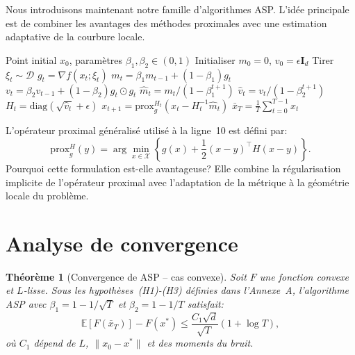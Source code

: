 \documentclass[12pt,a4paper]{report}
\newtheorem{theoreme}{Th\'eor\`eme}[chapter]
\begin{document}
Nous introduisons maintenant notre famille d'algorithmes ASP. L'id\'ee
principale est de combiner les avantages des m\'ethodes proximales avec
une estimation adaptative de la courbure locale.

\begin{algorithm}
\caption{ASP -- Adaptive Stochastic Proximal}\label{alg:asp}
\begin{algorithmic}[1]
\Require Point initial $x_0$, param\`etres $\beta_1, \beta_2 \in (0,1)$
\State Initialiser $m_0 = 0$, $v_0 = \epsilon \mathbf{I}_d$
  \State Tirer $\xi_t \sim \mathcal{D}$
  \State $g_t = \nabla f(x_t; \xi_t)$
  \State $m_t = \beta_1 m_{t-1} + (1-\beta_1) g_t$
  \State $v_t = \beta_2 v_{t-1} + (1-\beta_2) g_t \odot g_t$
  \State $\hat{m}_t = m_t / (1 - \beta_1^{t+1})$
  \State $\hat{v}_t = v_t / (1 - \beta_2^{t+1})$
  \State $H_t = \mathrm{diag}(\sqrt{\hat{v}_t} + \epsilon)$
  \State $x_{t+1} = \mathrm{prox}_{g}^{H_t} \left( x_t - H_t^{-1} \hat{m}_t \right)$
\EndFor
\State \Return $\bar{x}_T = \frac{1}{T} \sum_{t=0}^{T-1} x_t$
\end{algorithmic}
\end{algorithm}

L'op\'erateur proximal g\'en\'eralis\'e utilis\'e \`a la ligne~10 est
d\'efini par:
\begin{equation}\label{eq:prox-gen}
  \mathrm{prox}_{g}^{H}(y) = \arg\min_{x \in \mathcal{X}} \left\{
    g(x) + \frac{1}{2} (x - y)^\top H (x - y) \right\}.
\end{equation}
Pourquoi cette formulation est-elle avantageuse? Elle combine la
r\'egularisation implicite de l'op\'erateur proximal avec l'adaptation
de la m\'etrique \`a la g\'eom\'etrie locale du probl\`eme.

\section{Analyse de convergence}

\begin{theoreme}[Convergence de ASP -- cas convexe]\label{thm:asp-convex}
Soit $F$ une fonction convexe et $L$-lisse. Sous les hypoth\`eses~(H1)-(H3)
d\'efinies dans l'Annexe~A, l'algorithme ASP avec $\beta_1 = 1 - 1/\sqrt{T}$
et $\beta_2 = 1 - 1/T$ satisfait:
\begin{equation}
  \mathbb{E}[F(\bar{x}_T)] - F(x^*) \leq \frac{C_1 \sqrt{d}}{\sqrt{T}}
    \left( 1 + \log T \right),
\end{equation}
o\`u $C_1$ d\'epend de $L$, $\|x_0 - x^*\|$ et des moments du bruit.
\end{theoreme}
\end{document}
